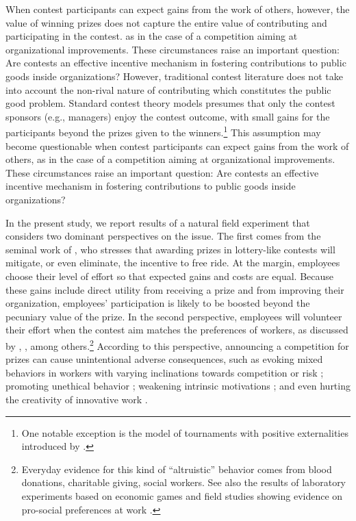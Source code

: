 \documentclass[11pt, titlepage]{article}
\begin{document}
When contest participants can expect gains from the work of others,
however, the value of winning prizes does not capture the entire value
of contributing and participating in the contest. as in the case of a
competition aiming at organizational improvements. These circumstances
raise an important question: Are contests an effective incentive
mechanism in fostering contributions to public goods inside
organizations? However, traditional contest literature does not take
into account the non-rival nature of contributing which constitutes the
public good problem. Standard contest theory models presumes that only
the contest sponsors (e.g., managers) enjoy the contest outcome, with
small gains for the participants beyond the prizes given to the
winners.\footnote{One notable exception is the model of tournaments with
  positive externalities introduced by \citet{drago1988incentive}.} This
assumption may become questionable when contest participants can expect
gains from the work of others, as in the case of a competition aiming at
organizational improvements. These circumstances raise an important
question: Are contests an effective incentive mechanism in fostering
contributions to public goods inside organizations?

In the present study, we report results of a natural field experiment
that considers two dominant perspectives on the issue. The first comes
from the seminal work of \citet{morgan2000financing}, who stresses that
awarding prizes in lottery-like contests will mitigate, or even
eliminate, the incentive to free ride. At the margin, employees choose
their level of effort so that expected gains and costs are equal.
Because these gains include direct utility from receiving a prize and
from improving their organization, employees' participation is likely to
be boosted beyond the pecuniary value of the prize. In the second
perspective, employees will volunteer their effort when the contest aim
matches the preferences of workers, as discussed by
\citet{besley2005competition}, \citet{prendergast2007motivation},
\citet{delfgaauw2008incentives} among others.\footnote{Everyday evidence
  for this kind of ``altruistic'' behavior comes from blood donations,
  charitable giving, social workers. See also the results of laboratory
  experiments based on economic games
  \citep[see][]{levitt2007laboratory} and field studies showing evidence
  on pro-social preferences at work
  \citep{bandiera2005social, dellavigna2016estimating}.} According to
this perspective, announcing a competition for prizes can cause
unintentional adverse consequences, such as evoking mixed behaviors in
workers with varying inclinations towards competition or risk
\citep[e.g., men and women][]{niederle2007women, croson2009gender};
promoting unethical behavior \citep{lazear1989pay, charness2013dark};
weakening intrinsic motivations \citep{reeve1996elements, frey1997not};
and even hurting the creativity of innovative work
\citep{erat2015incentives}.
\end{document}
